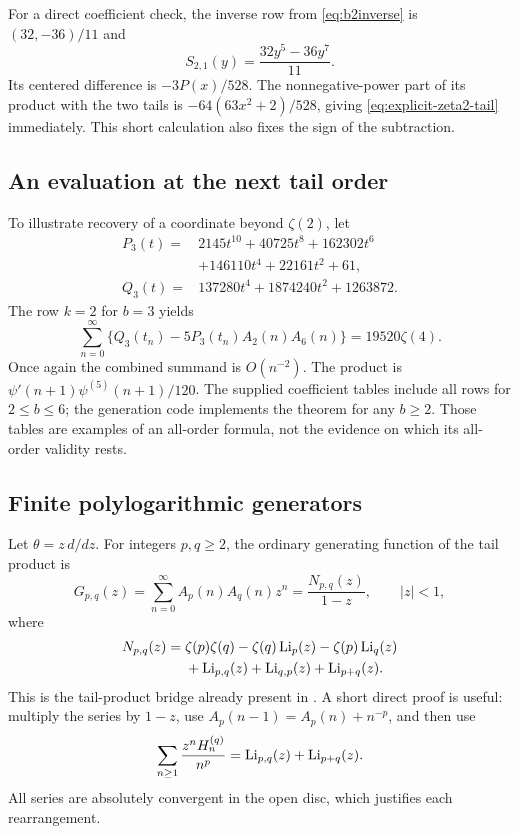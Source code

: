 For a direct coefficient check, the inverse row from
\eqref{eq:b2inverse} is $(32,-36)/11$ and
\[
 S_{2,1}(y)=\frac{32y^5-36y^7}{11}.
\]
Its centered difference is $-3P(x)/528$. The nonnegative-power
part of its product with the two tails is
$-64(63x^2+2)/528$, giving
\eqref{eq:explicit-zeta2-tail} immediately. This short calculation
also fixes the sign of the subtraction.

\subsection{An evaluation at the next tail order}

To illustrate recovery of a coordinate beyond $\zeta(2)$, let
\begin{align*}
 P_3(t)={}&2145t^{10}+40725t^8+162302t^6\\
          &+146110t^4+22161t^2+61,\\
 Q_3(t)={}&137280t^4+1874240t^2+1263872.
\end{align*}
The row $k=2$ for $b=3$ yields
\begin{equation}\label{eq:explicit-zeta4}
 \boxed{\displaystyle
 \sum_{n=0}^{\infty}
  \{Q_3(t_n)-5P_3(t_n)A_2(n)A_6(n)\}
 =19520\zeta(4).}
\end{equation}
Once again the combined summand is $O(n^{-2})$. The product is
$\psi'(n+1)\psi^{(5)}(n+1)/120$.
The supplied coefficient tables include all rows for $2\leq b\leq6$;
the generation code implements the theorem for any $b\geq2$.
Those tables are examples of an all-order formula, not the evidence
on which its all-order validity rests.

\subsection{Finite polylogarithmic generators}

Let $\theta=z\,d/dz$. For integers $p,q\geq2$, the ordinary
generating function of the tail product is
\begin{equation}\label{eq:Gpq}
 G_{p,q}(z)=\sum_{n=0}^{\infty}A_p(n)A_q(n)z^n
 =\frac{N_{p,q}(z)}{1-z},\qquad |z|<1,
\end{equation}
where
\begin{align}\label{eq:Npq}
 N_{p,q}(z)={}&\zeta(p)\zeta(q)-\zeta(q)\operatorname{Li}_p(z)
             -\zeta(p)\operatorname{Li}_q(z)\notag\\
 &+\operatorname{Li}_{p,q}(z)+\operatorname{Li}_{q,p}(z)+\operatorname{Li}_{p+q}(z).
\end{align}
This is the tail-product bridge already present in
\cite{incoming-tail}. A short direct proof is useful: multiply the
series by $1-z$, use
$A_p(n-1)=A_p(n)+n^{-p}$, and then use
\[
 \sum_{n\geq1}\frac{z^nH_n^{(q)}}{n^p}
   =\operatorname{Li}_{p,q}(z)+\operatorname{Li}_{p+q}(z).
\]
All series are absolutely convergent in the open disc, which justifies
each rearrangement.

